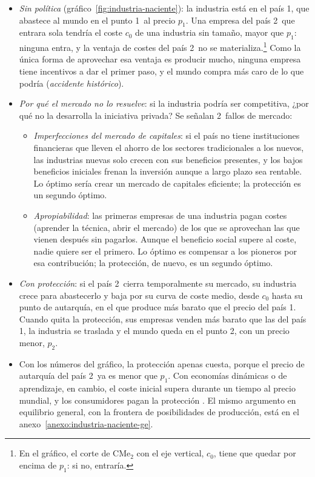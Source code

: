 \documentclass[11pt]{article}
\begin{document}
\begin{itemize}
\item \emph{Sin política} (gráfico~\ref{fig:industria-naciente}): la industria está en el país 1, que abastece al mundo en el punto 1~al precio $p_1$. Una empresa del país 2~que entrara sola tendría el coste $c_0$ de una industria sin tamaño, mayor que $p_1$: ninguna entra, y la ventaja de costes del país 2~no se materializa.\footnote{En el gráfico, el corte de $\mathrm{CMe}_2$ con el eje vertical, $c_0$, tiene que quedar por encima de $p_1$: si no, entraría.} Como la única forma de aprovechar esa ventaja es producir mucho, ninguna empresa tiene incentivos a dar el primer paso, y el mundo compra más caro de lo que podría (\emph{accidente histórico}).
\item \emph{Por qué el mercado no lo resuelve}: si la industria podría ser competitiva, ¿por qué no la desarrolla la iniciativa privada? Se señalan 2~fallos de mercado\nocite{KrugmanObstfeldMelitz2018International}:
  \begin{itemize}
  \item \emph{Imperfecciones del mercado de capitales}: si el país no tiene instituciones financieras que lleven el ahorro de los sectores tradicionales a los nuevos, las industrias nuevas solo crecen con sus beneficios presentes, y los bajos beneficios iniciales frenan la inversión aunque a largo plazo sea rentable. Lo óptimo sería crear un mercado de capitales eficiente; la protección es un segundo óptimo.
  \item \emph{Apropiabilidad}: las primeras empresas de una industria pagan costes (aprender la técnica, abrir el mercado) de los que se aprovechan las que vienen después sin pagarlos. Aunque el beneficio social supere al coste, nadie quiere ser el primero. Lo óptimo es compensar a los pioneros por esa contribución; la protección, de nuevo, es un segundo óptimo.
  \end{itemize}
\item \emph{Con protección}: si el país 2~cierra temporalmente su mercado, su industria crece para abastecerlo y baja por su curva de coste medio, desde $c_0$ hasta su punto de autarquía, en el que produce más barato que el precio del país 1. Cuando quita la protección, sus empresas venden más barato que las del país 1, la industria se traslada y el mundo queda en el punto 2, con un precio menor, $p_2$.
\item Con los números del gráfico, la protección apenas cuesta, porque el precio de autarquía del país 2~ya es menor que $p_1$. Con economías dinámicas o de aprendizaje, en cambio, el coste inicial supera durante un tiempo al precio mundial, y los consumidores pagan la protección . El mismo argumento en equilibrio general, con la frontera de posibilidades de producción, está en el anexo~\ref{anexo:industria-naciente-ge}.
\end{itemize}
\end{document}
